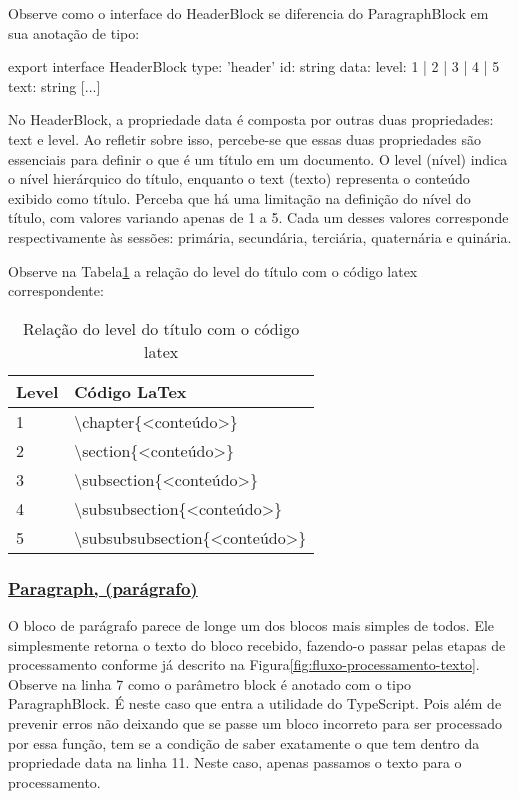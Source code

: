 Observe como o interface do HeaderBlock se diferencia
do ParagraphBlock em sua anotação de tipo:

\begin{HeaderBlockCode}
[...]
export interface HeaderBlock {
    type: 'header'
    id: string
    data: {
        level: 1 | 2 | 3 | 4 | 5
        text: string
    }
}
[...]
\end{HeaderBlockCode}

No HeaderBlock, a propriedade data é composta por outras duas propriedades: text e level.
Ao refletir sobre isso, percebe-se que essas duas propriedades são essenciais para definir
o que é um título em um documento. O level (nível) indica o nível hierárquico do título,
enquanto o text (texto) representa o conteúdo exibido como título. Perceba que há uma
limitação na definição do nível do título, com valores variando apenas de 1 a 5.
Cada um desses valores corresponde respectivamente às sessões: primária, secundária, terciária, quaternária e quinária.

Observe na
            Tabela\ref{tbl:header-level-latex}
            a relação do level do título com o código
            \acrshort{latex}
            correspondente:

\begin{table}[H]
    \centering
    \caption{Relação do level do título com o código latex}
    \label{tbl:header-level-latex}
    \renewcommand{\arraystretch}{1.5}
    \begin{tabular}{p{1.0320cm} p{5.8480cm}}
        \hline
        \textbf{Level} & \textbf{Código LaTex} \\
        \hline
        1 & \textbackslash chapter\{<conteúdo>\} \\
		2 & \textbackslash section\{<conteúdo>\} \\
		3 & \textbackslash subsection\{<conteúdo>\} \\
		4 & \textbackslash subsubsection\{<conteúdo>\} \\
		5 & \textbackslash subsubsubsection\{<conteúdo>\} \\
        \hline
        
    \end{tabular}
\end{table}

\subsubsection{\underline{Paragraph, (parágrafo)}}

O bloco de parágrafo parece de longe um dos blocos mais simples de todos.
Ele simplesmente retorna o texto do bloco recebido, fazendo-o passar
pelas etapas de processamento conforme já descrito na
Figura\ref{fig:fluxo-processamento-texto}.
Observe na linha 7 como o parâmetro block é anotado com o tipo ParagraphBlock.
É neste caso que entra a utilidade do TypeScript. Pois além de prevenir erros
não deixando que se passe um bloco incorreto para ser processado por essa função,
tem se a condição de saber exatamente o que tem dentro da propriedade
data na linha 11. Neste caso, apenas passamos o texto para o processamento.

